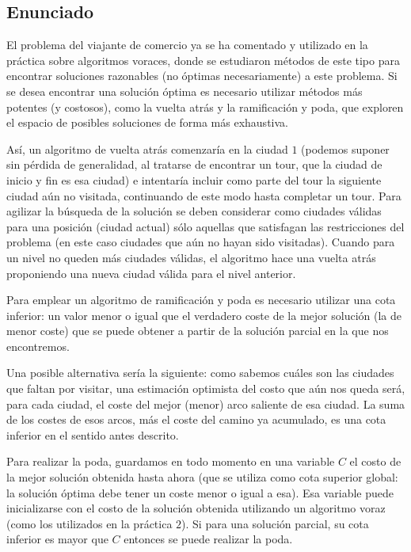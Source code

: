 \subsection{Enunciado}
El problema del viajante de comercio ya se ha comentado y utilizado en la práctica sobre
algoritmos voraces, donde se estudiaron métodos de este tipo para encontrar soluciones razonables (no óptimas necesariamente) a este problema. 
Si se desea encontrar una solución óptima es necesario utilizar métodos más potentes (y costosos), 
como la vuelta atrás y la ramificación y poda, que exploren el espacio de posibles soluciones de forma más exhaustiva.

Así, un algoritmo de vuelta atrás comenzaría en la ciudad $1$ (podemos suponer sin pérdida
de generalidad, al tratarse de encontrar un tour, que la ciudad de inicio y fin es esa ciudad) e
intentaría incluir como parte del tour la siguiente ciudad aún no visitada, continuando de este
modo hasta completar un tour. Para agilizar la búsqueda de la solución se deben considerar como
ciudades válidas para una posición (ciudad actual) sólo aquellas que satisfagan las restricciones
del problema (en este caso ciudades que aún no hayan sido visitadas). Cuando para un nivel
no queden más ciudades válidas, el algoritmo hace una vuelta atrás proponiendo una nueva
ciudad válida para el nivel anterior.

Para emplear un algoritmo de ramificación y poda es necesario utilizar una cota inferior:
un valor menor o igual que el verdadero coste de la mejor solución (la de menor coste) que se
puede obtener a partir de la solución parcial en la que nos encontremos.

Una posible alternativa sería la siguiente: como sabemos cuáles son las ciudades que faltan
por visitar, una estimación optimista del costo que aún nos queda será, para cada ciudad, el
coste del mejor (menor) arco saliente de esa ciudad. La suma de los costes de esos arcos, más
el coste del camino ya acumulado, es una cota inferior en el sentido antes descrito.

Para realizar la poda, guardamos en todo momento en una variable $C$ el costo de la mejor
solución obtenida hasta ahora (que se utiliza como cota superior global: la solución óptima
debe tener un coste menor o igual a esa). Esa variable puede inicializarse con el costo de la
solución obtenida utilizando un algoritmo voraz (como los utilizados en la práctica $2$). Si para
una solución parcial, su cota inferior es mayor que $C$ entonces se puede realizar la poda.

